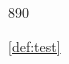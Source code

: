 \documentclass[./test]{subfiles}
\begin{document}
\begin{definition}\label{def:test}
  890
\end{definition}
\ref{def:test}
\end{document}
